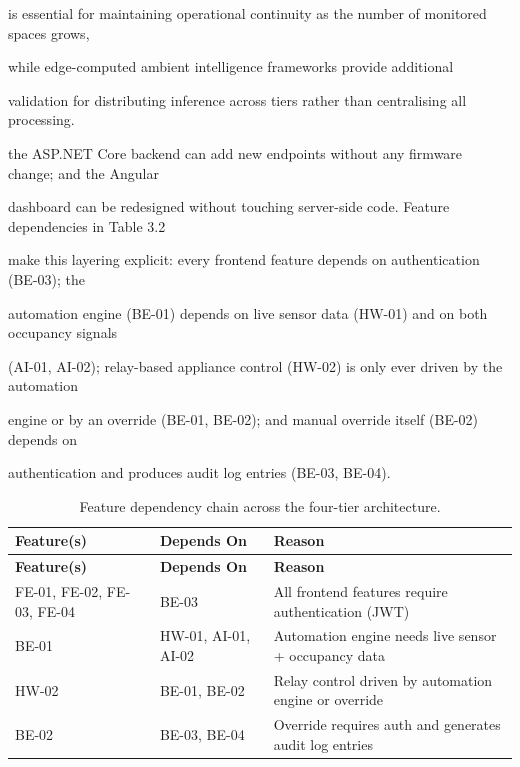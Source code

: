 is essential for maintaining operational continuity as the number of monitored spaces grows,

while edge-computed ambient intelligence frameworks \cite{gomez2025} provide additional

validation for distributing inference across tiers rather than centralising all processing.

the ASP.NET Core backend can add new endpoints without any firmware change; and the Angular

dashboard can be redesigned without touching server-side code. Feature dependencies in Table 3.2

make this layering explicit: every frontend feature depends on authentication (BE-03); the

automation engine (BE-01) depends on live sensor data (HW-01) and on both occupancy signals

(AI-01, AI-02); relay-based appliance control (HW-02) is only ever driven by the automation

engine or by an override (BE-01, BE-02); and manual override itself (BE-02) depends on

authentication and produces audit log entries (BE-03, BE-04).

\begin{longtable}{|L{3.8cm}|L{2.8cm}|L{6.0cm}|}
	\caption{Feature dependency chain across the four-tier architecture.} \label{tab:3-2}                     \\
	\hline
	\textbf{Feature(s)}        & \textbf{Depends On} & \textbf{Reason}                                        \\
	\hline
	\endfirsthead
	\hline
	\textbf{Feature(s)}        & \textbf{Depends On} & \textbf{Reason}                                        \\
	\hline
	\endhead
	\hline
	\endfoot
	\hline
	\endlastfoot
	FE-01, FE-02, FE-03, FE-04 & BE-03               & All frontend features require authentication (JWT)     \\
	\hline
	BE-01                      & HW-01, AI-01, AI-02 & Automation engine needs live sensor + occupancy data   \\
	\hline
	HW-02                      & BE-01, BE-02        & Relay control driven by automation engine or override  \\
	\hline
	BE-02                      & BE-03, BE-04        & Override requires auth and generates audit log entries \\
	\hline
\end{longtable}

